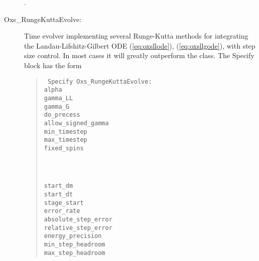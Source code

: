 \begin{description}
\begin{ExampleMifs}[Example]
  .
\end{ExampleMifs}

%
\item[Oxs\_RungeKuttaEvolve:\label{html:RungeKuttaEvolve}]
Time evolver implementing several Runge-Kutta methods for integrating
the Landau-Lifshitz-Gilbert ODE
(\ref{eq:oxsllode}), (\ref{eq:oxsllgode}), with step size control.  In
most cases it will greatly outperform the  class.
The Specify block has the form
   \begin{latexonly}
   \begin{quote}\tt
   Specify Oxs\_RungeKuttaEvolve: \ocb\\
    \bi alpha                  \oxsval{$\alpha$}\\
    \bi gamma\_LL              \oxsval{$\bar{\gamma}$}\\
    \bi gamma\_G               \oxsval{$\gamma$}\\
    \bi do\_precess            \\
    \bi allow\_signed\_gamma \\
    \bi min\_timestep          \\
    \bi max\_timestep          \\
    \bi fixed\_spins \ocb\\
    \bi\bi {}\\
    \bi\bi  {}\\
    \bi\ccb\\
    \bi start\_dm              \oxsval{$\Delta \vm$}\\
    \bi start\_dt              \\
    \bi stage\_start           \\
    \bi error\_rate            \\
    \bi absolute\_step\_error  \\
    \bi relative\_step\_error  \\
    \bi energy\_precision      \\
    \bi min\_step\_headroom    \\
    \bi max\_step\_headroom    \\

\end{quote}
\end{latexonly}
\end{description}
